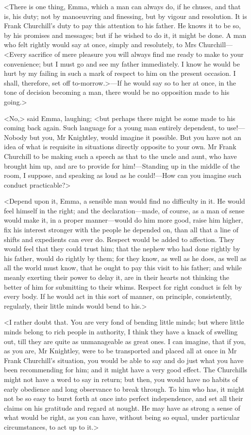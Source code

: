 <There is one thing, Emma, which a man can always do, if he chuses, and that is, his duty; not by manoeuvring and finessing, but by vigour and resolution. It is Frank Churchill's duty to pay this attention to his father. He knows it to be so, by his promises and messages; but if he wished to do it, it might be done. A man who felt rightly would say at once, simply and resolutely, to Mrs Churchill—<Every sacrifice of mere pleasure you will always find me ready to make to your convenience; but I must go and see my father immediately. I know he would be hurt by my failing in such a mark of respect to him on the present occasion. I shall, therefore, set off to-morrow.>—If he would say so to her at once, in the tone of decision becoming a man, there would be no opposition made to his going.>

<No,> said Emma, laughing; <but perhaps there might be some made to his coming back again. Such language for a young man entirely dependent, to use!—Nobody but you, Mr Knightley, would imagine it possible. But you have not an idea of what is requisite in situations directly opposite to your own. Mr Frank Churchill to be making such a speech as that to the uncle and aunt, who have brought him up, and are to provide for him!—Standing up in the middle of the room, I suppose, and speaking as loud as he could!—How can you imagine such conduct practicable?>

<Depend upon it, Emma, a sensible man would find no difficulty in it. He would feel himself in the right; and the declaration—made, of course, as a man of sense would make it, in a proper manner—would do him more good, raise him higher, fix his interest stronger with the people he depended on, than all that a line of shifts and expedients can ever do. Respect would be added to affection. They would feel that they could trust him; that the nephew who had done rightly by his father, would do rightly by them; for they know, as well as he does, as well as all the world must know, that he ought to pay this visit to his father; and while meanly exerting their power to delay it, are in their hearts not thinking the better of him for submitting to their whims. Respect for right conduct is felt by every body. If he would act in this sort of manner, on principle, consistently, regularly, their little minds would bend to his.>

<I rather doubt that. You are very fond of bending little minds; but where little minds belong to rich people in authority, I think they have a knack of swelling out, till they are quite as unmanageable as great ones. I can imagine, that if you, as you are, Mr Knightley, were to be transported and placed all at once in Mr Frank Churchill's situation, you would be able to say and do just what you have been recommending for him; and it might have a very good effect. The Churchills might not have a word to say in return; but then, you would have no habits of early obedience and long observance to break through. To him who has, it might not be so easy to burst forth at once into perfect independence, and set all their claims on his gratitude and regard at nought. He may have as strong a sense of what would be right, as you can have, without being so equal, under particular circumstances, to act up to it.>


